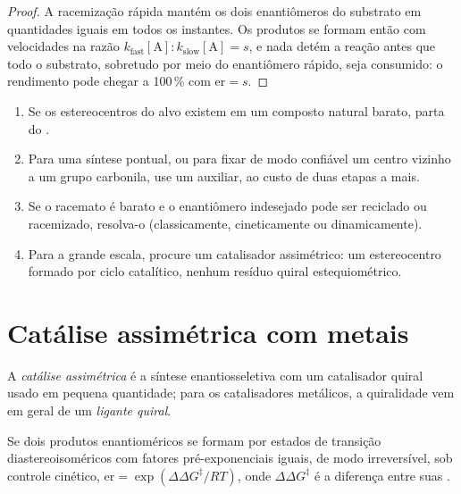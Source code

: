 \begin{proof}
A racemização rápida mantém os dois enantiômeros do substrato em quantidades iguais em todos os
instantes. Os produtos se formam então com velocidades na razão $k_{\mathrm{fast}}[\mathrm A] : k_{\mathrm{slow}}[\mathrm A] = s$, e nada
detém a reação antes que todo o substrato, sobretudo por meio do enantiômero rápido,
seja consumido: o rendimento pode chegar a 100\,\% com $\mathrm{er} = s$.
\end{proof}

\begin{method}\label{met:b3:asymmetric-synthesis:strategy}
\begin{enumerate}
  \item Se os estereocentros do alvo existem em um composto natural barato, parta
        do .
  \item Para uma síntese pontual, ou para fixar de modo confiável um centro vizinho a um grupo
        carbonila, use um auxiliar, ao custo de duas etapas a mais.
  \item Se o racemato é barato e o enantiômero indesejado pode ser reciclado ou
        racemizado, resolva-o (classicamente, cineticamente ou dinamicamente).
  \item Para a grande escala, procure um catalisador assimétrico: um estereocentro formado
        por ciclo catalítico, nenhum resíduo quiral estequiométrico.
\end{enumerate}
\end{method}

\section{Catálise assimétrica com metais}

\begin{definition}\label{def:b3:asymmetric-synthesis:asymmetric-catalysis}
A \emph{catálise assimétrica} é a síntese
enantiosseletiva com um catalisador quiral usado em pequena quantidade; para os catalisadores metálicos, a
quiralidade vem em geral de um \emph{ligante quiral}.
\end{definition}

\begin{theorem}\label{thm:b3:asymmetric-synthesis:er-ddg}
Se dois produtos enantioméricos se formam por estados de transição diastereoisoméricos
com fatores pré-exponenciais iguais, de modo irreversível, sob controle cinético,
$\mathrm{er} = \exp(\Delta\Delta G^\ddagger/RT)$, onde $\Delta\Delta G^\ddagger$ é a diferença entre suas .
\end{theorem}

